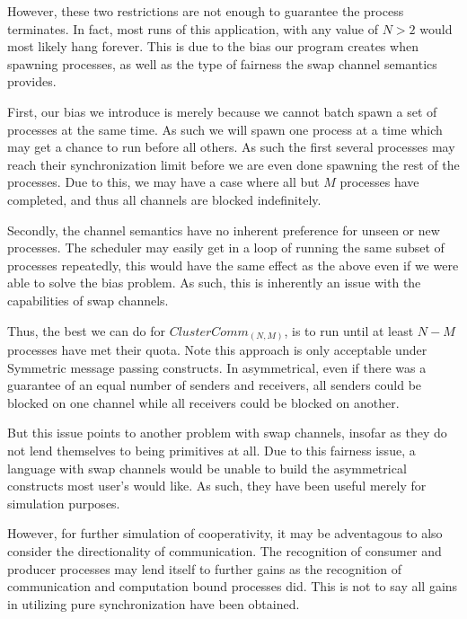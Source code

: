 However, these two restrictions are not enough to guarantee the process terminates.
In fact, most runs of this application, with any value of $N > 2$ would most 
likely hang forever. This is due to the bias our program creates when spawning
processes, as well as the type of fairness the swap channel semantics provides.

First, our bias we introduce is merely because we cannot batch spawn a set of
processes at the same time. As such we will spawn one process at a time which
may get a chance to run before all others. As such the first several processes
may reach their synchronization limit before we are even done spawning the rest
of the processes. Due to this, we may have a case where all but $M$ processes
have completed, and thus all channels are blocked indefinitely.

Secondly, the channel semantics have no inherent preference for unseen 
or new processes. The scheduler may easily get in a loop of running the same
subset of processes repeatedly, this would have the same effect as the above
even if we were able to solve the bias problem. As such, this is inherently an
issue with the capabilities of swap channels. 

Thus, the best we can do for $ClusterComm_{(N,M)}$, is to run until at least 
$N-M$ processes have met their quota. Note this approach is only acceptable 
under Symmetric message passing constructs. In asymmetrical, even if there was
a guarantee of an equal number of senders and receivers, all senders could be
blocked on one channel while all receivers could be blocked on another. 

But this issue points to another problem with swap channels, insofar as they do
not lend themselves to being primitives at all. Due to this fairness issue, a 
language with swap channels would be unable to build the asymmetrical constructs
most user's would like. As such, they have been useful merely for simulation 
purposes.

However, for further simulation of cooperativity, it may be adventagous to also 
consider the directionality of communication. The recognition of consumer and 
producer processes may lend itself to further gains as the recognition of 
communication and computation bound processes did. This is not to say all gains
in utilizing pure synchronization have been obtained. 
